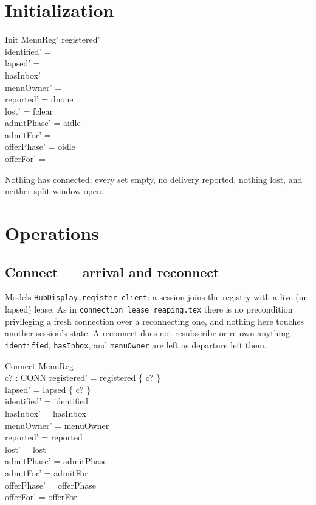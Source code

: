 \documentclass[a4paper,10pt,fleqn]{article}
\begin{document}
\section{Initialization}

\begin{schema}{Init}
  MenuReg'
\where
  registered' = \emptyset \\
  identified' = \emptyset \\
  lapsed' = \emptyset \\
  hasInbox' = \emptyset \\
  menuOwner' = \emptyset \\
  reported' = dnone \\
  lost' = fclear \\
  admitPhase' = aidle \\
  admitFor' = \emptyset \\
  offerPhase' = oidle \\
  offerFor' = \emptyset
\end{schema}

Nothing has connected: every set empty, no delivery reported, nothing lost,
and neither split window open.

\section{Operations}

\subsection{Connect --- arrival and reconnect}

Models \texttt{HubDisplay.register\_client}: a session joins the registry
with a live (un-lapsed) lease. As in \texttt{connection\_lease\_reaping.tex}
there is no precondition privileging a fresh connection over a reconnecting
one, and nothing here touches another session's state. A reconnect does not
resubscribe or re-own anything -- \texttt{identified}, \texttt{hasInbox},
and \texttt{menuOwner} are left as departure left them.

\begin{schema}{Connect}
  \Delta MenuReg \\
  c? : CONN
\where
  registered' = registered \cup \{ c? \} \\
  lapsed' = lapsed \setminus \{ c? \} \\
  identified' = identified \\
  hasInbox' = hasInbox \\
  menuOwner' = menuOwner \\
  reported' = reported \\
  lost' = lost \\
  admitPhase' = admitPhase \\
  admitFor' = admitFor \\
  offerPhase' = offerPhase \\
  offerFor' = offerFor
\end{schema}
\end{document}
